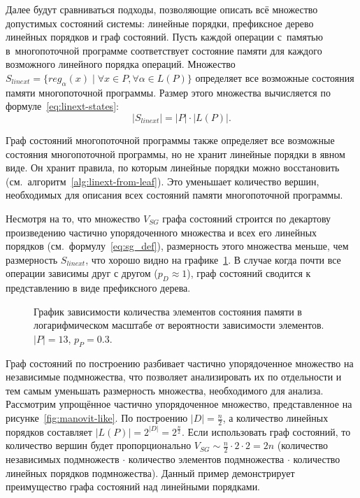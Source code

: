 Далее будут сравниваться подходы, позволяющие описать всё множество
допустимых состояний системы: линейные порядки, префиксное дерево
линейных порядков и граф состояний.
Пусть каждой операции с~памятью в~многопоточной программе
соответствует состояние памяти для каждого возможного линейного
порядка операций. Множество $S_{linext} = \{reg_{\alpha}(x) \mid
\forall x \in P, \forall \alpha \in L(P)\}$ определяет все возможные
состояния памяти многопоточной программы. Размер этого множества
вычисляется по формуле~\ref{eq:linext-states}:
\begin{equation}
  \label{eq:linext-states}
  |S_{linext}| = |P| \cdot |L(P)|.
\end{equation}

Граф состояний многопоточной программы также определяет все возможные
состояния многопоточной программы, но не хранит линейные порядки в
явном виде. Он хранит правила, по которым линейные порядки можно
восстановить (см.~алгоритм~\ref{alg:linext-from-leaf}). Это
уменьшает количество вершин, необходимых для описания всех состояний
памяти многопоточной программы.

Несмотря на то, что множество $V_{SG}$ графа состояний строится по
декартову произведению частично упорядоченного множества и всех его
линейных порядков (см.~формулу~\ref{eq:sg_def}), размерность этого множества
меньше, чем размерность $S_{linext}$, что хорошо видно на
графике~\ref{fig:sgnds-vs-linext}.
В случае когда почти все операции зависимы друг с другом ($p_D
\approx 1$), граф состояний сводится к представлению в виде префиксного дерева.

\begin{figure}[ht]
  \centering
  \centerfloat{
    
  }
  \caption{График зависимости количества элементов состояния памяти в
    логарифмическом масштабе от вероятности зависимости элементов. $|P|
  = 13$, $p_{P} = 0.3$.}
  \label{fig:sgnds-vs-linext}
\end{figure}

Граф состояний по построению
разбивает частично упорядоченное множество на независимые
подмножества, что позволяет анализировать их по отдельности и тем
самым уменьшать размерность множества, необходимого для анализа.
Рассмотрим упрощённое частично упорядоченное множество,
представленное на рисунке~\ref{fig:manovit-like}. По построению $|D|
= \frac{n}{2}$, а количество линейных порядков составляет $|L(P)| =
2^{|D|} = 2^{\frac{n}{2}}$. Если использовать граф состояний, то
количество вершин будет пропорционально $V_{SG} \sim \frac{n}{2}
\cdot 2 \cdot 2 = 2n$ (количество независимых подмножеств $\cdot$
  количество элементов подмножества $\cdot$ количество линейных
порядков подмножества). Данный пример демонстрирует
преимущество графа состояний над линейными порядками.


